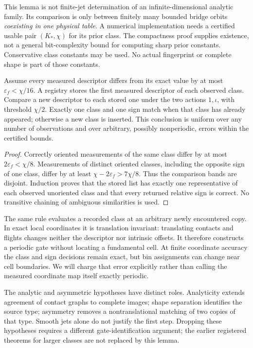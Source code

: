 This lemma is not finite-jet determination of an infinite-dimensional
analytic family. Its comparison is only between finitely many bounded
bridge orbits \emph{coexisting in one physical table}. A numerical
implementation needs a certified usable pair $(K_*,\chi)$ for its
prior class. The compactness proof supplies existence, not a general
bit-complexity bound for computing sharp prior constants. Conservative
class constants may be used. No actual fingerprint or complete shape is
part of those constants.

\begin{proposition}
\label{prop:registry}
Assume every measured descriptor differs from its exact value by at most
$\varepsilon_f<\chi/16$. A registry stores the first measured descriptor
of each observed class. Compare a new descriptor to each stored one under
the two actions $1,\iota$, with threshold $\chi/2$.
Exactly one class and one sign match when that class has already appeared;
otherwise a new class is inserted. This conclusion is uniform over any
number of observations and over arbitrary, possibly nonperiodic, errors
within the certified bounds.
\end{proposition}
\begin{proof}
Correctly oriented measurements of the same class differ by at most
$2\varepsilon_f<\chi/8$. Measurements of distinct oriented classes,
including the opposite sign of one class, differ by at least
$\chi-2\varepsilon_f>7\chi/8$. Thus the comparison bands are disjoint.
Induction proves that the stored list has exactly one representative of
each observed unoriented class and that every returned relative sign is
correct. No transitive chaining of ambiguous similarities is used.
\end{proof}

The same rule evaluates a recorded class at an arbitrary newly encountered
copy. In exact local coordinates it is translation invariant: translating
contacts and flights changes neither the descriptor nor intrinsic offsets.
It therefore constructs a periodic gate without locating a fundamental
cell. At finite coordinate accuracy the class and sign decisions remain
exact, but bin assignments can change near cell boundaries. We will charge
that error explicitly rather than calling the measured coordinate map
itself exactly periodic.

The analytic and asymmetric hypotheses have distinct roles. Analyticity
extends agreement of contact graphs to complete images; shape separation
identifies the source type; asymmetry removes a nontranslational matching
of two copies of that type. Smooth jets alone do not justify the first
step. Dropping these hypotheses requires a different gate-identification
argument; the earlier registered theorems for larger classes are not
replaced by this lemma.

